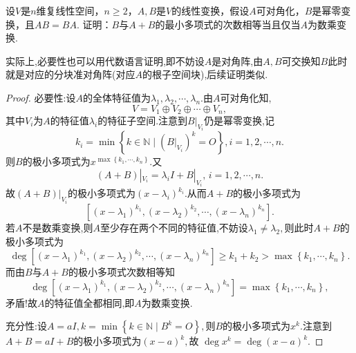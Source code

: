 \documentclass[../../main.tex]{subfiles}%
\begin{document}
\begin{example}
设$V$是$n$维复线性空间，$n \geqslant 2$，$A,B$是$V$的线性变换，假设$A$可对角化，$B$是幂零变换，且$AB = BA$. 证明：$B$与$A + B$的最小多项式的次数相等当且仅当$A$为数乘变换.
\end{example}
\begin{note}
实际上,必要性也可以用代数语言证明,即不妨设$A$是对角阵,由$A,B$可交换知$B$此时就是对应的分块准对角阵(对应$A$的根子空间块),后续证明类似.
\end{note}
\begin{proof}

{\heiti 必要性:}设$A$的全体特征值为$\lambda_1,\lambda_2,\cdots,\lambda_n$.由$A$可对角化知,
$$V=V_1\oplus V_2\oplus \cdots \oplus V_n,$$
其中$V_i$为$A$的特征值$\lambda_i$的特征子空间.注意到$B|_{V_i}$仍是幂零变换,记
$$k_i=\min\left\{k\in\mathbb{N}\mid (B|_{V_i})^k=O\right\},i=1,2,\cdots,n.$$
则$B$的极小多项式为$x^{\max\left\{k_1,\cdots,k_n\right\}}.$又
$$(A+B)|_{V_i}=\lambda_i I+B|_{V_i},\,i=1,2,\cdots,n.$$
故$(A+B)|_{V_i}$的极小多项式为$(x-\lambda_i)^{k_i}.$从而$A+B$的极小多项式为
$$\left[(x-\lambda_1)^{k_1},(x-\lambda_2)^{k_2},\cdots,(x-\lambda_n)^{k_n}\right].$$
若$A$不是数乘变换,则$A$至少存在两个不同的特征值,不妨设$\lambda_1\neq \lambda_2,$则此时$A+B$的极小多项式为
$$\deg\left[(x-\lambda_1)^{k_1},(x-\lambda_2)^{k_2},\cdots,(x-\lambda_n)^{k_n}\right]\geqslant k_1+k_2>\max\left\{k_1,\cdots,k_n\right\}.$$
而由$B$与$A+B$的极小多项式次数相等知
$$\deg\left[(x-\lambda_1)^{k_1},(x-\lambda_2)^{k_2},\cdots,(x-\lambda_n)^{k_n}\right]=\max\left\{k_1,\cdots,k_n\right\},$$
矛盾!故$A$的特征值全都相同,即$A$为数乘变换.

{\heiti 充分性:}设$A=aI,k=\min\left\{k\in\mathbb{N}\mid B^k=O\right\},$则$B$的极小多项式为$x^k.$注意到$A+B=aI+B$的极小多项式为$(x-a)^k,$故
$\deg x^k=\deg(x-a)^k.$

\end{proof}
\end{document}
